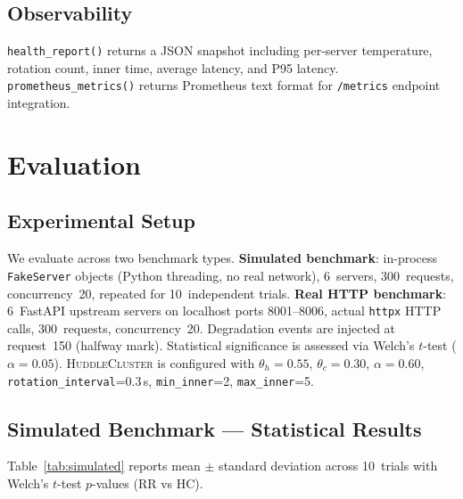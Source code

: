 \documentclass[10pt,twocolumn]{article}
\begin{document}
\subsection{Observability}

\texttt{health\_report()} returns a JSON snapshot including per-server
temperature, rotation count, inner time, average latency, and P95 latency.
\texttt{prometheus\_metrics()} returns Prometheus text format for
\texttt{/metrics} endpoint integration.

\section{Evaluation}
\label{sec:eval}

\subsection{Experimental Setup}

We evaluate across two benchmark types.
\textbf{Simulated benchmark}: in-process \texttt{FakeServer} objects
(Python threading, no real network), 6~servers, 300~requests,
concurrency~20, repeated for 10~independent trials.
\textbf{Real HTTP benchmark}: 6~FastAPI upstream servers on localhost
ports 8001--8006, actual \texttt{httpx} HTTP calls, 300~requests,
concurrency~20.
Degradation events are injected at request~150 (halfway mark).
Statistical significance is assessed via Welch's $t$-test ($\alpha=0.05$).
\textsc{HuddleCluster} is configured with $\theta_h=0.55$, $\theta_c=0.30$,
$\alpha=0.60$, \texttt{rotation\_interval}=0.3\,s,
\texttt{min\_inner}=2, \texttt{max\_inner}=5.

\subsection{Simulated Benchmark --- Statistical Results}

Table~\ref{tab:simulated} reports mean $\pm$ standard deviation across
10~trials with Welch's $t$-test $p$-values (RR vs HC).
\end{document}
